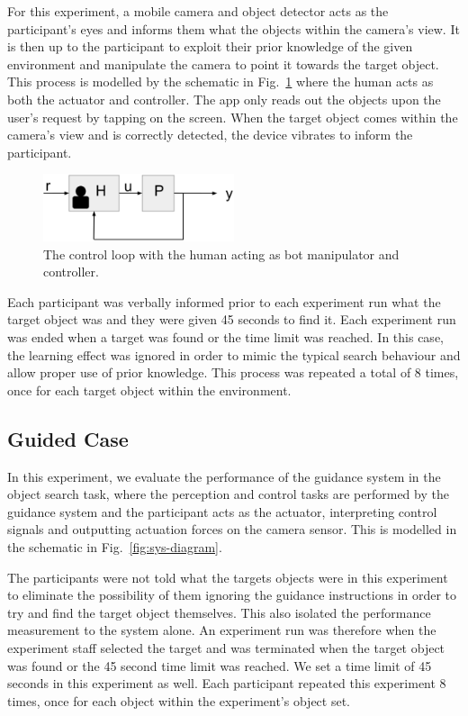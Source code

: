 \documentclass[runningheads]{llncs}
\begin{document}
For this experiment, a mobile camera and object detector acts as the participant's eyes and informs them what the objects within the camera's view.
It is then up to the participant to exploit their prior knowledge of the given environment and manipulate the camera to point it towards the target object. 
This process is modelled by the schematic in Fig.~\ref{fig:sys-diagram-no-controller} where the human acts as both the actuator and controller.
The app only reads out the objects upon the user's request by tapping on the screen. 
When the target object comes within the camera's view and is correctly detected, the device vibrates to inform the participant. 

\begin{figure}
  \centering
  \includegraphics[width=0.5\textwidth]{figures/control_loop_no_controller.png}
  \caption{The control loop with the human acting as bot manipulator and controller. }\label{fig:sys-diagram-no-controller}
\end{figure}

Each participant was verbally informed prior to each experiment run what the target object was and they were given 45 seconds to find it.
Each experiment run was ended when a target was found or the time limit was reached. 
In this case, the learning effect was ignored in order to mimic the typical search behaviour and allow proper use of prior knowledge. 
This process was repeated a total of 8 times, once for each target object within the environment. 

\subsection{Guided Case}

In this experiment, we evaluate the performance of the guidance system in the object search task, where the perception and control tasks are performed by the guidance system and the participant acts as the actuator, interpreting control signals and outputting actuation forces on the camera sensor. 
This is modelled in the schematic in Fig.~\ref{fig:sys-diagram}. 

The participants were not told what the targets objects were in this experiment to eliminate the possibility of them ignoring the guidance instructions in order to try and find the target object themselves.
This also isolated the performance measurement to the system alone.
An experiment run was therefore when the experiment staff selected the target and was terminated when the target object was found or the 45 second time limit was reached.
We set a time limit of 45 seconds in this experiment as well.
Each participant repeated this experiment 8 times, once for each object within the experiment's object set. 
\end{document}

